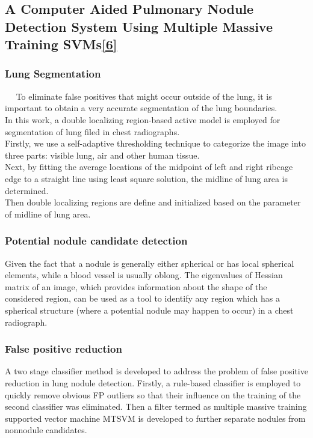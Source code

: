 \documentclass[hidelinks,12pt]{article}
\begin{document}
\newpage

\subsection{A Computer Aided Pulmonary Nodule Detection System Using Multiple Massive Training SVMs\hyperref[6]{[6]}}

\subsubsection{Lung Segmentation}
$\quad$ To eliminate false positives that might occur outside of the lung, it is important to obtain a very accurate segmentation of the lung boundaries.\\In this work, a double localizing region-based active model is employed for segmentation of lung filed in chest radiographs.\\

Firstly, we use a self-adaptive thresholding technique to categorize the image into three parts: visible lung, air and other human tissue.\\

Next, by fitting the average locations of the midpoint of left and right ribcage edge to a straight line using least square solution, the midline of lung area is determined.\\

Then double localizing regions are define and initialized based on the parameter of midline of lung area.


\subsubsection{Potential nodule candidate detection}
 Given the fact that a nodule is generally either spherical or has local spherical elements, while a blood vessel is usually oblong. The eigenvalues of Hessian matrix of an image, which provides information about the shape of the considered region, can be used as a tool to identify any region which has a spherical structure (where a potential nodule may happen to occur) in a chest radiograph.

\subsubsection{False positive reduction}
A two stage classifier method is developed to address the problem of false positive reduction in lung nodule detection. Firstly, a rule-based classifier is employed to quickly remove obvious FP outliers so that their influence on the training of the second classifier was eliminated. Then a filter termed as multiple massive training supported vector machine MTSVM is developed to further separate nodules from nonnodule candidates.
\end{document}
